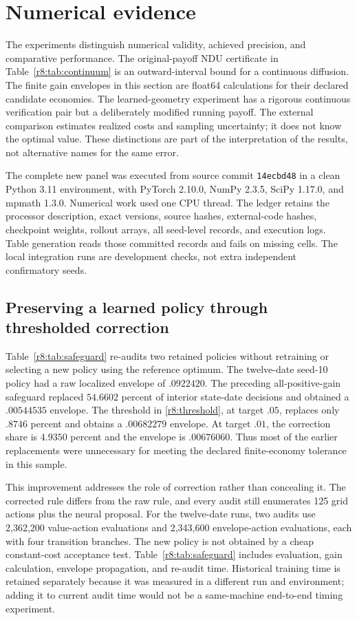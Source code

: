 \section{Numerical evidence}\label{r8:numerics}
The experiments distinguish numerical validity, achieved precision, and comparative performance. The original-payoff NDU certificate in Table~\ref{r8:tab:continuum} is an outward-interval bound for a continuous diffusion. The finite gain envelopes in this section are float64 calculations for their declared candidate economies. The learned-geometry experiment has a rigorous continuous verification pair but a deliberately modified running payoff. The external comparison estimates realized costs and sampling uncertainty; it does not know the optimal value. These distinctions are part of the interpretation of the results, not alternative names for the same error.

The complete new panel was executed from source commit \texttt{14ecbd48} in a clean Python 3.11 environment, with PyTorch 2.10.0, NumPy 2.3.5, SciPy 1.17.0, and mpmath 1.3.0. Numerical work used one CPU thread. The ledger retains the processor description, exact versions, source hashes, external-code hashes, checkpoint weights, rollout arrays, all seed-level records, and execution logs. Table generation reads those committed records and fails on missing cells. The local integration runs are development checks, not extra independent confirmatory seeds.

\subsection{Preserving a learned policy through thresholded correction}
Table~\ref{r8:tab:safeguard} re-audits two retained policies without retraining or selecting a new policy using the reference optimum. The twelve-date seed-10 policy had a raw localized envelope of $.0922420$. The preceding all-positive-gain safeguard replaced $54.6602$ percent of interior state-date decisions and obtained a $.00544535$ envelope. The threshold in \eqref{r8:threshold}, at target $.05$, replaces only $.8746$ percent and obtains a $.00682279$ envelope. At target $.01$, the correction share is $4.9350$ percent and the envelope is $.00676060$. Thus most of the earlier replacements were unnecessary for meeting the declared finite-economy tolerance in this sample.



This improvement addresses the role of correction rather than concealing it. The corrected rule differs from the raw rule, and every audit still enumerates 125 grid actions plus the neural proposal. For the twelve-date runs, two audits use 2,362,200 value-action evaluations and 2,343,600 envelope-action evaluations, each with four transition branches. The new policy is not obtained by a cheap constant-cost acceptance test. Table~\ref{r8:tab:safeguard} includes evaluation, gain calculation, envelope propagation, and re-audit time. Historical training time is retained separately because it was measured in a different run and environment; adding it to current audit time would not be a same-machine end-to-end timing experiment.


